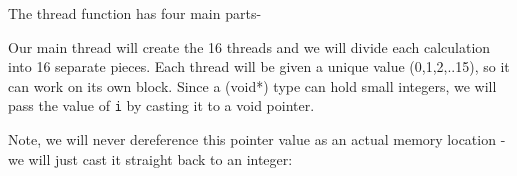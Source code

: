 The thread function has four main parts-

\begin{Shaded}
\begin{Highlighting}[]
  
\NormalTok{\}}
\end{Highlighting}
\end{Shaded}

Our main thread will create the 16 threads and we will divide each
calculation into 16 separate pieces. Each thread will be given a unique
value (0,1,2,..15), so it can work on its own block. Since a (void*)
type can hold small integers, we will pass the value of \texttt{i} by
casting it to a void pointer.

\begin{Shaded}
\begin{Highlighting}[]
 \NormalTok{data[}\NormalTok{][}\NormalTok{] ;}
 
    \NormalTok{(} 
         
\end{Highlighting}
\end{Shaded}

Note, we will never dereference this pointer value as an actual memory
location - we will just cast it straight back to an integer:

\begin{Shaded}
\begin{Highlighting}[]
  
   
   
    \NormalTok{\}}
\end{Highlighting}
\end{Shaded}

